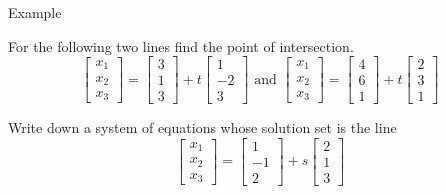 \documentclass{beamer}
\begin{document}
\begin{frame}{Example}
  \begin{example}
    For the following two lines find the point of intersection.
    \begin{equation*}
      \left[
	\begin{array}{c}
          x_1\\
          x_2\\
          x_3
	\end{array}
      \right] = \left[
	\begin{array}{c}
          3\\
          1\\
          3
	\end{array}
      \right]+ t \left[
	\begin{array}{c}
          1\\
          -2\\
          3
	\end{array}
      \right]\text{ and }
      \left[
	\begin{array}{c}
          x_1\\
          x_2\\
          x_3
	\end{array}
      \right] = \left[
	\begin{array}{c}
          4\\
          6\\
          1
	\end{array}
      \right]+ t \left[
	\begin{array}{c}
          2\\
          3\\
          1
	\end{array}
      \right]
    \end{equation*}
  \end{example}
  \begin{example}
    Write down a system of equations whose solution set is the line
    \begin{equation*}
      \left[
	\begin{array}{c}
          x_1\\
          x_2\\
          x_3
	\end{array}
      \right] = \left[
	\begin{array}{c}
          1\\
          -1\\
          2
	\end{array}
      \right]+s \left[
	\begin{array}{c}
          2\\
          1\\
          3
	\end{array}
      \right]
    \end{equation*}
  \end{example}
\end{frame}
\end{document}
